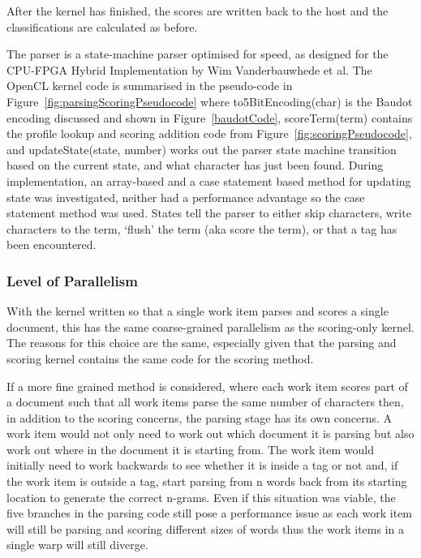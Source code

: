 After the kernel has finished, the scores are written back to the host and the
classifications are calculated as before.

The parser is a state-machine parser optimised for speed, as designed for the
CPU-FPGA Hybrid Implementation \cite{HybridCPUFPGA} by Wim Vanderbauwhede et al.
The OpenCL kernel code is summarised in the pseudo-code in
Figure~\ref{fig:parsingScoringPseudocode} where to5BitEncoding(char) is the
Baudot encoding discussed and shown in Figure~\ref{baudotCode}, scoreTerm(term)
contains the profile lookup and scoring addition code from
Figure~\ref{fig:scoringPseudocode}, and updateState(state, number) works out the
parser state machine transition based on the current state, and what character
has just been found. During implementation, an array-based and a case statement
based method for updating state was investigated, neither had a performance
advantage so the case statement method was used. States tell the parser to
either skip characters, write characters to the term, `flush' the term (aka
score the term), or that a tag has been encountered.

\subsubsection{Level of Parallelism}

With the kernel written so that a single work item parses and scores a single
document, this has the same coarse-grained parallelism as the scoring-only
kernel. The reasons for this choice are the same, especially given that the
parsing and scoring kernel contains the same code for the scoring method.

If a more fine grained method is considered, where each work item scores part of
a document such that all work items parse the same number of characters then, in
addition to the scoring concerns, the parsing stage has its own concerns. A work
item would not only need to work out which document it is parsing but also work
out where in the document it is starting from. The work item would initially
need to work backwards to see whether it is inside a tag or not and, if the work
item is outside a tag, start parsing from n words back from its starting
location to generate the correct n-grams. Even if this situation was viable, the
five branches in the parsing code still pose a performance issue as each work
item will still be parsing and scoring different sizes of words thus the work
items in a single warp will still diverge.

